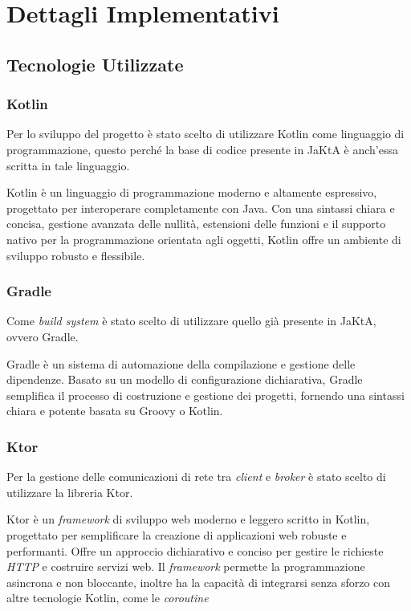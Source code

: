 \section{Dettagli Implementativi}

\subsection{Tecnologie Utilizzate}

\subsubsection{Kotlin}

Per lo sviluppo del progetto è stato scelto di utilizzare Kotlin\cite{kotlin} come linguaggio di programmazione, questo perché la base di codice presente in JaKtA è anch'essa scritta in tale linguaggio.

Kotlin è un linguaggio di programmazione moderno e altamente espressivo, progettato per interoperare completamente con Java\cite{java}.
Con una sintassi chiara e concisa, gestione avanzata delle nullità, estensioni delle funzioni e il supporto nativo per la programmazione orientata agli oggetti, Kotlin offre un ambiente di sviluppo robusto e flessibile.

\subsubsection{Gradle}

Come \textit{build system} è stato scelto di utilizzare quello già presente in JaKtA, ovvero Gradle\cite{gradle}.

Gradle è un sistema di automazione della compilazione e gestione delle dipendenze. Basato su un modello di configurazione dichiarativa, Gradle semplifica il processo di costruzione e gestione dei progetti, fornendo una sintassi chiara e potente basata su Groovy\cite{groovy} o Kotlin.

\subsubsection{Ktor}

Per la gestione delle comunicazioni di rete tra \textit{client} e \textit{broker} è stato scelto di utilizzare la libreria Ktor\cite{ktor}.

Ktor è un \textit{framework} di sviluppo web moderno e leggero scritto in Kotlin, progettato per semplificare la creazione di applicazioni web robuste e performanti. Offre un approccio dichiarativo e conciso per gestire le richieste \textit{HTTP} e costruire servizi web. Il \textit{framework} permette la programmazione asincrona e non bloccante, inoltre ha la capacità di integrarsi senza sforzo con altre tecnologie Kotlin, come le \textit{coroutine}

